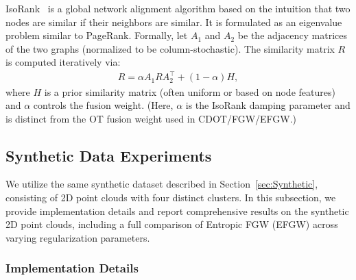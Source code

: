\documentclass{article}
\theoremstyle{plain}
\theoremstyle{definition}
\theoremstyle{remark}
\begin{document}
IsoRank~\citep{singh2008global} is a global network alignment algorithm based on the intuition that two nodes are similar if their neighbors are similar. It is formulated as an eigenvalue problem similar to PageRank. Formally, let $A_1$ and $A_2$ be the adjacency matrices of the two graphs (normalized to be column-stochastic). The similarity matrix $R$ is computed iteratively via:
\begin{align*}
	R = \alpha A_1 R A_2^\top + (1-\alpha) H,
\end{align*}
where $H$ is a prior similarity matrix (often uniform or based on node features) and $\alpha$ controls the fusion weight. (Here, $\alpha$ is the IsoRank damping parameter and is distinct from the OT fusion weight used in CDOT/FGW/EFGW.)

\subsection{Synthetic Data Experiments}

We utilize the same synthetic dataset described in Section~\ref{sec:Synthetic}, consisting of 2D point clouds with four distinct clusters. In this subsection, we provide implementation details and report comprehensive results on the synthetic 2D point clouds, including a full comparison of Entropic FGW (EFGW) across varying regularization parameters.

\subsubsection{Implementation Details}
\end{document}
